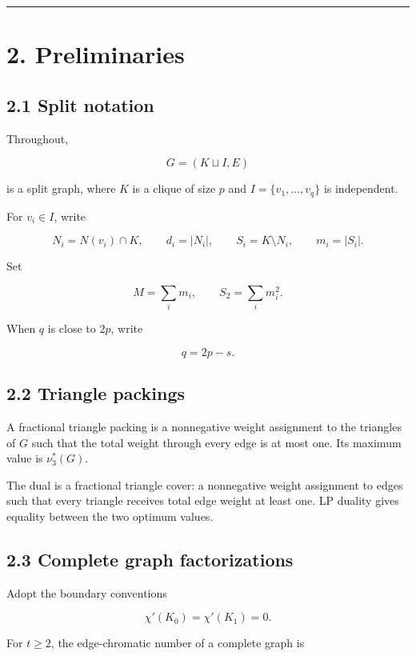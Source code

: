 \documentclass[11pt,a4paper]{article}
\begin{document}
\begin{center}\rule{0.5\linewidth}{0.5pt}\end{center}

\section{2. Preliminaries}\label{preliminaries}

\subsection{2.1 Split notation}\label{split-notation}

Throughout,

\[
G=(K\sqcup I,E)
\]

is a split graph, where \(K\) is a clique of size \(p\) and \(I=\{v_1,\ldots,v_q\}\) is independent.

For \(v_i\in I\), write

\[
N_i=N(v_i)\cap K,
\qquad
d_i=|N_i|,
\qquad
S_i=K\setminus N_i,
\qquad
m_i=|S_i|.
\]

Set

\[
M=\sum_i m_i,
\qquad
S_2=\sum_i m_i^2.
\]

When \(q\) is close to \(2p\), write

\[
q=2p-s.
\tag{2.1}
\]

\subsection{2.2 Triangle packings}\label{triangle-packings}

A fractional triangle packing is a nonnegative weight assignment to the triangles of \(G\) such that the total weight through every edge is at most one. Its maximum value is \(\nu_3^*(G)\).

The dual is a fractional triangle cover: a nonnegative weight assignment to edges such that every triangle receives total edge weight at least one. LP duality gives equality between the two optimum values.

\subsection{2.3 Complete graph factorizations}\label{complete-graph-factorizations}

Adopt the boundary conventions

\[
\chi'(K_0)=\chi'(K_1)=0.
\]

For \(t\ge2\), the edge-chromatic number of a complete graph is
\end{document}
